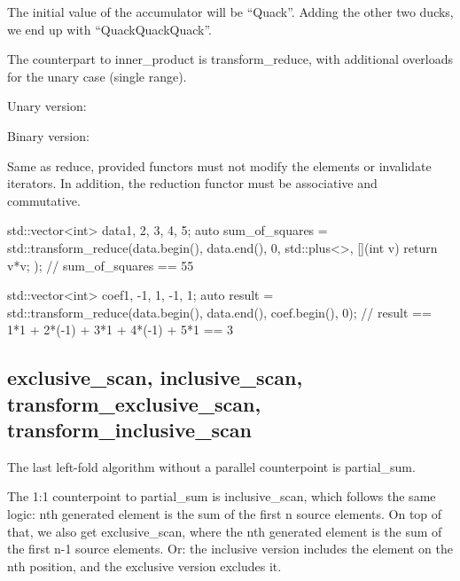 The initial value of the accumulator will be “Quack”. Adding the other two ducks, we end up with “QuackQuackQuack”.

The counterpart to inner\_product is transform\_reduce, with additional overloads for the unary case (single range).


Unary version:


Binary version:


Same as reduce, provided functors must not modify the elements or invalidate iterators. In addition, the reduction functor must be associative and commutative.

\begin{box-note}
\begin{cppcode}
std::vector<int> data{1, 2, 3, 4, 5};
auto sum_of_squares = std::transform_reduce(data.begin(), data.end(), 0, 
                                            std::plus<>{}, [](int v) { return v*v; });
// sum_of_squares == 55

std::vector<int> coef{1, -1, 1, -1, 1};
auto result = std::transform_reduce(data.begin(), data.end(), coef.begin(), 0);
// result == 1*1 + 2*(-1) + 3*1 + 4*(-1) + 5*1 == 3
\end{cppcode}
\end{box-note}

\subsection{exclusive\_scan, inclusive\_scan, transform\_exclusive\_scan, transform\_inclusive\_scan}

The last left-fold algorithm without a parallel counterpoint is partial\_sum.



The 1:1 counterpoint to partial\_sum is inclusive\_scan, which follows the same logic: nth generated element is the sum of the first n source elements. On top of that, we also get exclusive\_scan, where the nth generated element is the sum of the first n-1 source elements. Or: the inclusive version includes the element on the nth position, and the exclusive version excludes it.

